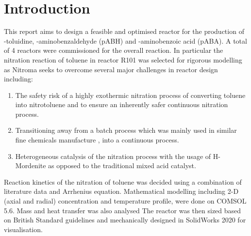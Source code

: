 \section{Introduction}
This report aims to design a feasible and optimised reactor for the production of \ortho-toluidine, \para-aminobenzaldehyde (pABH) and \para-aminobenzoic acid (pABA). A total of 4 reactors were commissioned for the overall reaction. 
In particular the nitration reaction of toluene in reactor R101 was selected for rigorous modelling as Nitroma seeks to overcome several major challenges in reactor design including:

\begin{enumerate}
    \item The safety risk of a highly exothermic nitration process of converting toluene into nitrotoluene and to ensure an inherently safer continuous nitration process. 
    \item Transitioning away from a batch process which was mainly used in similar fine chemicals manufacture \cite{di_miceli_raimondi_safety_2015}, into a continuous process. 
    \item Heterogeneous catalysis of the nitration process with the usage of H-Mordenite as opposed to the traditional mixed acid catalyst. 
\end{enumerate}

Reaction kinetics of the nitration of toluene was decided using a combination of literature data and Arrhenius equation. Mathematical modelling including 2-D (axial and radial) concentration and temperature profile, were done on COMSOL 5.6. Mass and heat transfer was also analysed  The reactor was then sized based on British Standard guidelines and mechanically designed in SolidWorks 2020 for visualisation.


